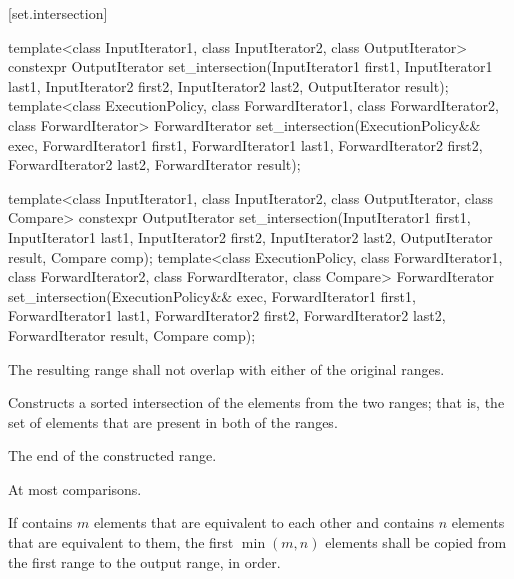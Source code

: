 [set.intersection]{}

%
\begin{itemdecl}
template<class InputIterator1, class InputIterator2,
         class OutputIterator>
  constexpr OutputIterator
    set_intersection(InputIterator1 first1, InputIterator1 last1,
                     InputIterator2 first2, InputIterator2 last2,
                     OutputIterator result);
template<class ExecutionPolicy, class ForwardIterator1, class ForwardIterator2,
         class ForwardIterator>
  ForwardIterator
    set_intersection(ExecutionPolicy&& exec,
                     ForwardIterator1 first1, ForwardIterator1 last1,
                     ForwardIterator2 first2, ForwardIterator2 last2,
                     ForwardIterator result);

template<class InputIterator1, class InputIterator2,
         class OutputIterator, class Compare>
  constexpr OutputIterator
    set_intersection(InputIterator1 first1, InputIterator1 last1,
                     InputIterator2 first2, InputIterator2 last2,
                     OutputIterator result, Compare comp);
template<class ExecutionPolicy, class ForwardIterator1, class ForwardIterator2,
         class ForwardIterator, class Compare>
  ForwardIterator
    set_intersection(ExecutionPolicy&& exec,
                     ForwardIterator1 first1, ForwardIterator1 last1,
                     ForwardIterator2 first2, ForwardIterator2 last2,
                     ForwardIterator result, Compare comp);
\end{itemdecl}

\begin{itemdescr}
\pnum
\requires
The resulting range shall not overlap with either of the original ranges.

\pnum
\effects
Constructs a sorted intersection of the elements from the two ranges;
that is, the set of elements that are present in both of the ranges.

\pnum
\returns
The end of the constructed range.

\pnum
\complexity
At most
comparisons.

\pnum
\remarks If  contains $m$ elements that are equivalent to
each other and  contains $n$ elements that are equivalent
to them, the first $\min(m, n)$ elements shall be copied from the first range
to the output range, in order.
\end{itemdescr}

